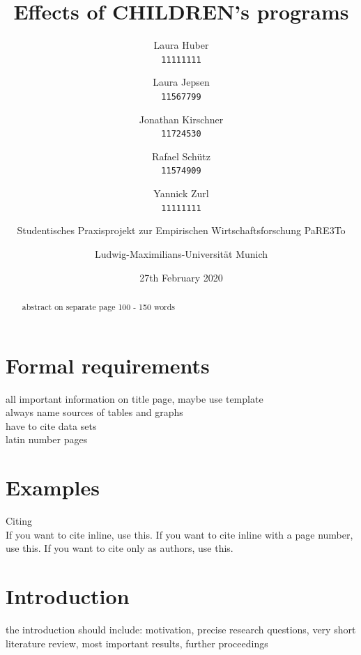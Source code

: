 \documentclass[12pt, a4paper, titlepage]{article}\usepackage[]{graphicx}\usepackage[]{color}
\title{Effects of CHILDREN's programs}
\author{
Laura Huber\\
\texttt{11111111}
\and
Laura Jepsen\\
\texttt{11567799}
\and
Jonathan Kirschner\\
\texttt{11724530}
\and
Rafael Schütz\\
\texttt{11574909} 
\and 
Yannick Zurl\\
\texttt{11111111}
\and
Studentisches Praxisprojekt zur Empirischen Wirtschaftsforschung PaRE3To\\
\and
Ludwig-Maximilians-Universität Munich
}
\date{27th February 2020}
\begin{document}
\maketitle

\tableofcontents
\listoftables

\listoffigures

\begin{abstract} 
abstract on separate page
100 - 150 words
\end{abstract}

\section{Formal requirements}
all important information on title page, maybe use template\\
always name sources of tables and graphs\\
have to cite data sets\\
latin number pages\\


\section{Examples}

Citing\\

If you want to cite \textcite{Millstein.2020} inline, use this.
If you want to cite \parencite[p.4]{Millstein.2020} inline with a page number, use this.
If you want to cite \citeauthor{Millstein.2020} only as authors, use this.


\section{Introduction}

the introduction should include: motivation, precise research questions, very short literature review, most important results, further proceedings
\end{document}
